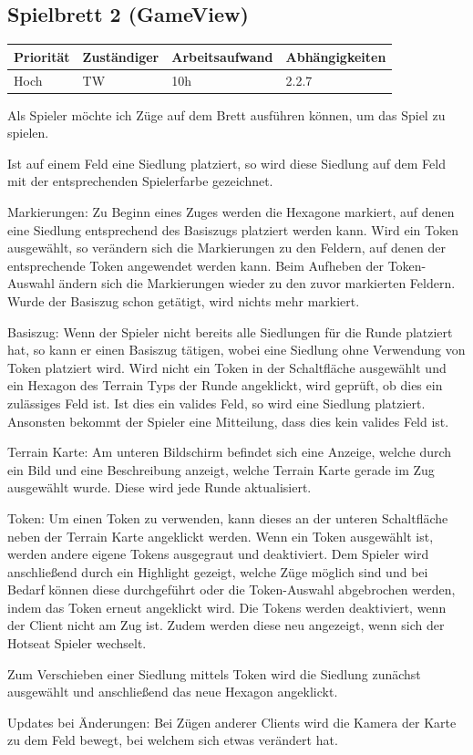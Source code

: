 \documentclass[a4paper]{scrreprt}
\newenvironment{requirement}[5] {
	\subsection{#1}
	\begin{tabularx}{\textwidth}{|X|l|X|X|}
		\hline
		Priorität & Zuständiger & Arbeitsaufwand & Abhängigkeiten \\
		\hline
		#2 & #3 & #4 & #5 \\
		\hline
	\end{tabularx}
	}{
	\newpage
	}
\begin{document}
\begin{requirement}{Spielbrett 2 (GameView)}{Hoch}{TW}{10h}{2.2.7}

\begin{center}
	Als Spieler möchte ich Züge auf dem Brett ausführen können, um das Spiel zu spielen.
\end{center}

Ist auf einem Feld eine Siedlung platziert, so wird diese Siedlung auf dem Feld mit der entsprechenden Spielerfarbe gezeichnet.

Markierungen:
Zu Beginn eines Zuges werden die Hexagone markiert, auf denen eine Siedlung entsprechend des Basiszugs platziert werden kann. Wird ein Token ausgewählt, so verändern sich die Markierungen zu den Feldern, auf denen der entsprechende Token angewendet werden kann. Beim Aufheben der Token-Auswahl ändern sich die Markierungen wieder zu den zuvor markierten Feldern. Wurde der Basiszug schon getätigt, wird nichts mehr markiert.

Basiszug:
Wenn der Spieler nicht bereits alle Siedlungen für die Runde platziert hat, so kann er einen Basiszug tätigen, wobei eine Siedlung ohne Verwendung von Token platziert wird.
Wird nicht ein Token in der Schaltfläche ausgewählt und ein Hexagon des Terrain Typs der Runde angeklickt, wird geprüft, ob dies ein zulässiges Feld ist. Ist dies ein valides Feld, so wird eine Siedlung platziert. Ansonsten bekommt der Spieler eine Mitteilung, dass dies kein valides Feld ist.

Terrain Karte:
Am unteren Bildschirm befindet sich eine Anzeige, welche durch ein Bild und eine Beschreibung anzeigt, welche Terrain Karte gerade im Zug ausgewählt wurde. Diese wird jede Runde aktualisiert.

Token:
Um einen Token zu verwenden, kann dieses an der unteren Schaltfläche neben der Terrain Karte angeklickt werden. Wenn ein Token ausgewählt ist, werden andere eigene Tokens ausgegraut und deaktiviert. Dem Spieler wird anschließend durch ein Highlight gezeigt, welche Züge möglich sind und bei Bedarf können diese durchgeführt oder die Token-Auswahl abgebrochen werden, indem das Token erneut angeklickt wird.
Die Tokens werden deaktiviert, wenn der Client nicht am Zug ist. Zudem werden diese neu angezeigt, wenn sich der Hotseat Spieler wechselt.

Zum Verschieben einer Siedlung mittels Token wird die Siedlung zunächst ausgewählt und anschließend das neue Hexagon angeklickt.

Updates bei Änderungen:
Bei Zügen anderer Clients wird die Kamera der Karte zu dem Feld bewegt, bei welchem sich etwas verändert hat.


\end{requirement}
\end{document}
